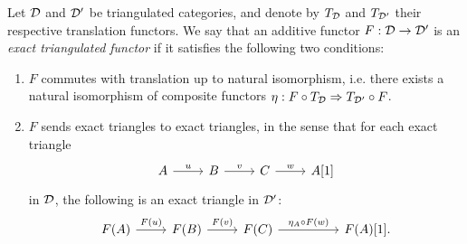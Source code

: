 \begin{definition}
  Let $\mathcal{D}$ and $\triangcat{D}'$ be triangulated
  categories, and denote by $T_{\mathcal{D}}$ and
  $T_{\mathcal{D}'}$ their respective translation functors.
  We say that an additive functor $F: \mathcal{D} \to
  \mathcal{D}'$ is an \emph{exact triangulated functor} if it
  satisfies the following two conditions:
  \begin{enumerate}
    \item
      $F$ commutes with translation up to natural isomorphism,
      i.e. there exists a natural isomorphism of composite functors
      $\eta: F \circ T_{\mathcal{D}} \Rightarrow T_{\mathcal{D}'} \circ F$.

    \item
      $F$ sends exact triangles to exact triangles, in the sense that
      for each exact triangle
      \[
        \begin{tikzcd}
          A \arrow[r, "u"]
          & B \arrow[r, "v"]
          & C \arrow[r, "w"]
          & A[1]
        \end{tikzcd}
      \]
      in $\mathcal{D}$, the following is an exact triangle in
      $\triangcat{D}'$:
      \[
        \begin{tikzcd}
          {F(A)} & {F(B)} & {F(C)} && {F(A)[1]}.
          \arrow["{F(u)}", from=1-1, to=1-2]
          \arrow["{F(v)}", from=1-2, to=1-3]
          \arrow["{\eta_A \circ F(w)}", from=1-3, to=1-5]
        \end{tikzcd}
      \]
  \end{enumerate}
\end{definition}

\iffalse
\begin{remark}
  This definition may seem stronger than initially stated, but the
  first condition is essential to impose, as applying $F$ to an exact
  triangle only gives a sequence
  \[
    \begin{tikzcd}
      F(A) \arrow[r, "F(u)"]
      & F(B) \arrow[r, "F(v)"]
      & F(C) \arrow[r, "F(w)"]
      & F(A[1])
    \end{tikzcd}
  \]
  in $\triangcat{D}'$, which is not a well-formed triangle without
  the isomorphism
  $F(A[1]) \cong F(A)[1]$.
\end{remark}
\fi
